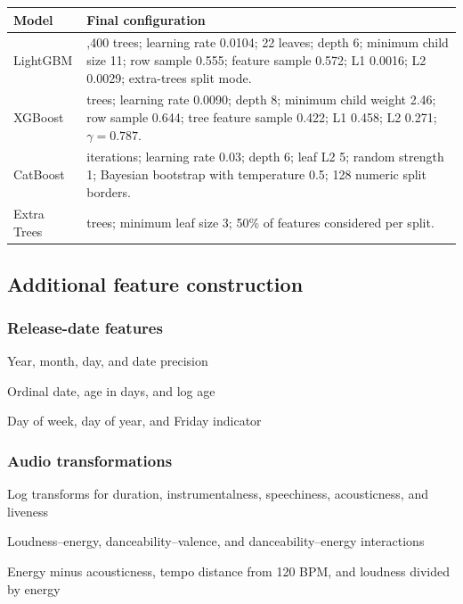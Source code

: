 \documentclass{article}
\begin{document}
\begin{center}
\scriptsize
\setlength{\tabcolsep}{4pt}
\renewcommand{\arraystretch}{1.08}
\begin{tabularx}{0.98\textwidth}{@{}>{\raggedright\arraybackslash}p{}
  >{\raggedright\arraybackslash}X@{}}
\toprule
\textbf{Model} & \textbf{Final configuration} \\
\midrule
LightGBM & 1,400 trees; learning rate 0.0104; 22 leaves; depth 6;
minimum child size 11; row sample 0.555; feature sample 0.572; L1 0.0016;
L2 0.0029; extra-trees split mode. \\
XGBoost & 800 trees; learning rate 0.0090; depth 8; minimum child weight
2.46; row sample 0.644; tree feature sample 0.422; L1 0.458; L2 0.271;
\(\gamma=0.787\). \\
CatBoost & 800 iterations; learning rate 0.03; depth 6; leaf L2 5;
random strength 1; Bayesian bootstrap with temperature 0.5; 128 numeric
split borders. \\
Extra Trees & 800 trees; minimum leaf size 3; 50\% of features considered
per split. \\
\bottomrule
\end{tabularx}
\end{center}

\subsection{Additional feature construction}
\label{app:features}
\subsubsection{Release-date features}
\begin{compactitem}
  \item Year, month, day, and date precision
  \item Ordinal date, age in days, and log age
  \item Day of week, day of year, and Friday indicator
\end{compactitem}

\subsubsection{Audio transformations}
\begin{compactitem}
  \item Log transforms for duration, instrumentalness, speechiness,
  acousticness, and liveness
  \item Loudness--energy, danceability--valence, and danceability--energy
  interactions
  \item Energy minus acousticness, tempo distance from 120 BPM, and loudness
  divided by energy
\end{compactitem}
\end{document}
